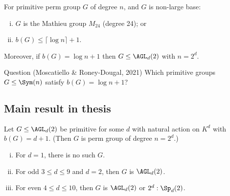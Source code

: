 \begin{slide}
    \begin{theorem}
        \vspace{0pt}
        For primitive perm group $G$ of degree $n$, and $G$ is non-large base:
        \begin{enumerate}[(i)]
            \item $G$ is the Mathieu group $M_{24}$ (degree 24); or
            \item $b(G) \leq \lceil\log n\rceil + 1$.
        \end{enumerate} \pause

        Moreover, if $b(G) = \log n + 1$ then $G \leq \AGL_d(2)$ with $n = 2^d$.
    \end{theorem} \pause

    \begin{alertblock}{Question (Moscatiello \& Roney-Dougal, 2021)}
        \vspace{0pt}
        Which primitive groups $G \leq \Sym(n)$ satisfy $b(G) = \log n + 1$?
    \end{alertblock}
\end{slide}

\subsection{Main result in thesis}

\begin{slide}
    \begin{theorem}
        \vspace{0pt}
        Let $G \leq \AGL_d(2)$ be primitive for some $d$ with natural action on $K^d$ with $b(G) = d + 1$. (Then $G$ is perm group of degree $n = 2^d$.)
        \begin{enumerate}[(i)]
            \item For $d = 1$, there is no such $G$. \pause
            \item For odd $3 \leq d \leq 9$ and $d = 2$, then $G$ is $\AGL_d(2)$. \pause
            \item For even $4 \leq d \leq 10$, then $G$ is $\AGL_d(2)$ or $2^d : \Sp_d(2)$.
        \end{enumerate}
    \end{theorem}
\end{slide}


